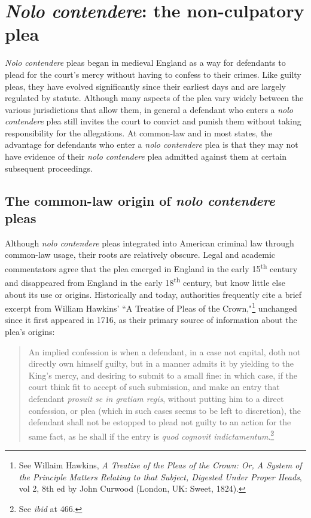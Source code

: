 \section{\textit{Nolo contendere}: the non-culpatory plea}

\textit{Nolo contendere} pleas began in medieval England as a way for defendants to plead for the court's mercy without having to confess to their crimes. Like guilty pleas, they have evolved significantly since their earliest days and are largely regulated by statute. Although many aspects of the plea vary widely between the various jurisdictions that allow them, in general a defendant who enters a \textit{nolo contendere} plea still invites the court to convict and punish them without taking responsibility for the allegations. At common-law and in most states, the advantage for defendants who enter a \textit{nolo contendere} plea is that they may not have evidence of their \textit{nolo contendere} plea admitted against them at certain subsequent proceedings. 

\subsection{The common-law origin of \textit{nolo contendere} pleas}

Although \textit{nolo contendere} pleas integrated into American criminal law through common-law usage, their roots are relatively obscure. Legal and academic commentators agree that the plea emerged in England in the early 15\textsuperscript{th} century and disappeared from England in the early 18\textsuperscript{th} century, but know little else about its use or origins. Historically and today, authorities frequently cite a brief excerpt from William Hawkins' ``A Treatise of Pleas of the Crown,"\footnote{See Willaim Hawkins, \textit{A Treatise of the Pleas of the Crown: Or, A System of the Principle Matters Relating to that Subject, Digested Under Proper Heads}, vol 2, 8th ed by John Curwood (London, UK: Sweet, 1824).} unchanged since it first appeared in 1716, as their primary source of information about the plea's origins:

\begin{quote}
\singlespacing
An implied confession is when a defendant, in a case not capital, doth not directly own himself guilty, but in a manner admits it by yielding to the King's mercy, and desiring to submit to a small fine: in which case, if the court think fit to accept of such submission, and make an entry that defendant \textit{prosuit se in gratiam regis}, without putting him to a direct confession, or plea (which in such cases seems to be left to discretion), the defendant shall not be estopped to plead not guilty to an action for the same fact, as he shall if the entry is \textit{quod cognovit indictamentum}.\footnote{See \textit{ibid} at 466.}
\end{quote}

